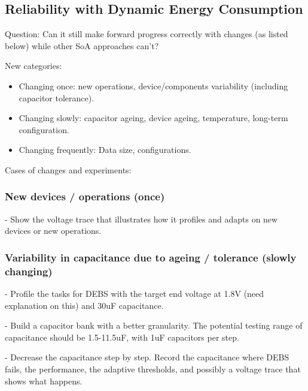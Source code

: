 

\subsection{Reliability with Dynamic Energy Consumption}

Question: Can it still make forward progress correctly with changes (as listed below) while other SoA approaches can't? 


New categories:

\begin{itemize}
    \item Changing once: new operations, device/components variability (including capacitor tolerance).
    \item Changing slowly: capacitor ageing, device ageing, temperature, long-term configuration.
    \item Changing frequently: Data size, configurations. 
\end{itemize}


Cases of changes and experiments:

\subsubsection{New devices / operations (once)}

- Show the voltage trace that illustrates how it profiles and adapts on new devices or new operations. 

\subsubsection{Variability in capacitance due to ageing / tolerance (slowly changing)}

- Profile the tasks for DEBS with the target end voltage at 1.8V (need explanation on this) and 30uF capacitance. 

- Build a capacitor bank with a better granularity. The potential testing range of capacitance should be 1.5-11.5uF, with 1uF capacitors per step. 

- Decrease the capacitance step by step. Record the capacitance where DEBS fails, the performance, the adaptive thresholds, and possibly a voltage trace that shows what happens. 

% 
% 



